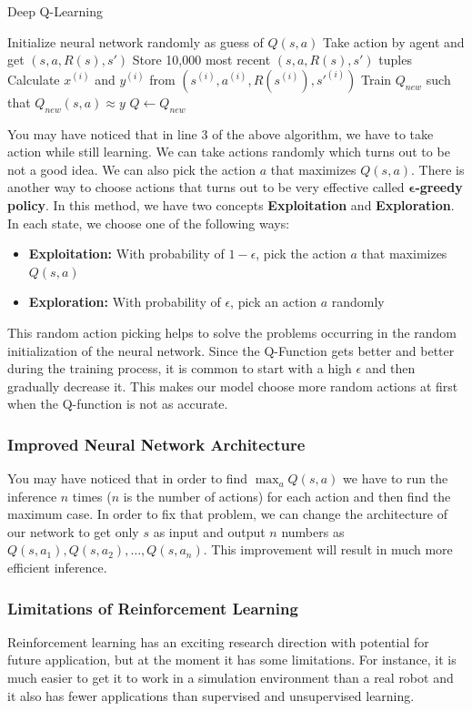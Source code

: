 \documentclass[a4paper, 12pt]{book}
\begin{document}
\begin{algorithm}
\caption{Deep Q-Learning}
\begin{algorithmic} [1]
\State Initialize neural network randomly as guess of $Q(s, a)$
\Repeat
    \State Take action by agent and get $(s, a, R(s), s')$
    \State Store 10,000 most recent $(s, a, R(s), s')$ tuples
    \State Calculate $x^{(i)}$ and $y^{(i)}$ from $(s^{(i)}, a^{(i)}, R(s^{(i)}), s'^{(i)})$
    \State Train $Q_{new}$ such that $Q_{new} (s, a) \approx y$
    \State $Q \gets Q_{new}$
\end{algorithmic}
\end{algorithm}

You may have noticed that in line 3 of the above algorithm, we have to take action while still learning. We can take actions randomly which turns out to be not a good idea. We can also pick the action $a$ that maximizes $Q(s, a)$. There is another way to choose actions that turns out to be very effective called \textbf{$\mathbf{\epsilon}$-greedy policy}. In this method, we have two concepts \textbf{Exploitation} and \textbf{Exploration}. In each state, we choose one of the following ways:
\begin{itemize}
    \item \textbf{Exploitation:} With probability of $1-\epsilon$, pick the action $a$ that maximizes $Q(s, a)$
    \item \textbf{Exploration:} With probability of $\epsilon$, pick an action $a$ randomly
\end{itemize}
This random action picking helps to solve the problems occurring in the random initialization of the neural network. Since the Q-Function gets better and better during the training process, it is common to start with a high $\epsilon$ and then gradually decrease it. This makes our model choose more random actions at first when the Q-function is not as accurate.

\subsubsection{Improved Neural Network Architecture}

You may have noticed that in order to find $\max_{a} Q(s, a)$ we have to run the inference $n$ times ($n$ is the number of actions) for each action and then find the maximum case. In order to fix that problem, we can change the architecture of our network to get only $s$ as input and output $n$ numbers as $Q(s, a_1), Q(s, a_2), \dots, Q(s, a_n)$. This improvement will result in much more efficient inference. 

\subsubsection{Limitations of Reinforcement Learning}

Reinforcement learning has an exciting research direction with potential for future application, but at the moment it has some limitations. For instance, it is much easier to get it to work in a simulation environment than a real robot and it also has fewer applications than supervised and unsupervised learning.
\end{document}
